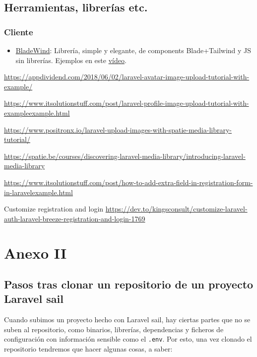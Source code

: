 \documentclass[11pt]{article}
\begin{document}
\subsection{Herramientas, librerías etc.}
\label{sec:org0b03ed5}
\subsubsection{Cliente}
\label{sec:orgee6c190}
\begin{itemize}
\item \href{https://bladewindui.com/}{BladeWind}: Librería, simple y elegante, de components
Blade+Tailwind y JS sin librerías. Ejemplos en este \href{https://www.youtube.com/watch?v=UoKa5aKkv1U}{vídeo}.
\end{itemize}



\url{https://appdividend.com/2018/06/02/laravel-avatar-image-upload-tutorial-with-example/}

\url{https://www.itsolutionstuff.com/post/laravel-profile-image-upload-tutorial-with-exampleexample.html}

\url{https://www.positronx.io/laravel-upload-images-with-spatie-media-library-tutorial/}

\url{https://spatie.be/courses/discovering-laravel-media-library/introducing-laravel-media-library}

\url{https://www.itsolutionstuff.com/post/how-to-add-extra-field-in-registration-form-in-laravelexample.html}

Customize registration and login
\url{https://dev.to/kingsconsult/customize-laravel-auth-laravel-breeze-registration-and-login-1769}


\newpage


\section{Anexo II}
\label{sec:org4568954}
\subsection{Pasos tras clonar un repositorio de un proyecto Laravel sail}
\label{sec:org4be2a6d}
Cuando subimos un proyecto hecho con Laravel sail, hay ciertas partes
que no se suben al repositorio, como binarios, librerías, dependencias
y ficheros de configuración con información sensible como el
\texttt{.env}. Por esto, una vez clonado el repositorio tendremos que hacer
algunas cosas, a saber:
\end{document}
